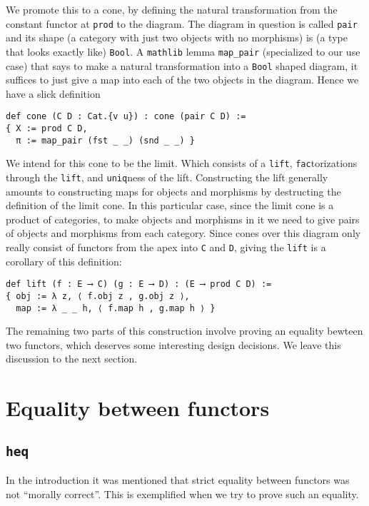 \documentclass{article}
\newcommand{\<}{\langle}
\renewcommand{\>}{\rangle}
\theoremstyle{definitionstyle}
\theoremstyle{exercisestyle}
\theoremstyle{remarkstyle}
\begin{document}
We promote this to a cone, by defining the natural transformation from
the constant functor at \texttt{prod} to the diagram.
The diagram in question is called \texttt{pair} and its shape
(a category with just two objects with no morphisms) is (a type that looks exactly like) \texttt{Bool}.
A \texttt{mathlib} lemma \texttt{map\_pair} (specialized to our use case) that says to make a
natural transformation into a \texttt{Bool} shaped diagram,
it suffices to just give a map into each of the two objects in the diagram.
Hence we have a slick definition

\begin{lstlisting}
def cone (C D : Cat.{v u}) : cone (pair C D) :=
{ X := prod C D,
  π := map_pair (fst _ _) (snd _ _) } \end{lstlisting}

We intend for this cone to be the limit.
Which consists of a \texttt{lift}, \texttt{fac}torizations through the \texttt{lift},
and \texttt{uniq}ness of the lift.
Constructing the lift generally amounts to constructing maps for objects and morphisms
by destructing the definition of the limit cone.
In this particular case, since the limit cone is a product of categories,
to make objects and morphisms in it we need to give pairs of objects
and morphisms from each category.
Since cones over this diagram only really consist of functors from the apex
into \texttt{C} and \texttt{D}, giving the \texttt{lift} is a corollary of this definition:

\begin{lstlisting}
def lift (f : E ⟶ C) (g : E ⟶ D) : (E ⟶ prod C D) :=
{ obj := λ z, ⟨ f.obj z , g.obj z ⟩,
  map := λ _ _ h, ⟨ f.map h , g.map h ⟩ }\end{lstlisting}

The remaining two parts of this construction involve proving an equality bewteen two functors,
which deserves some interesting design decisions.
We leave this discussion to the next section.

\section{Equality between functors}

\subsection{\texttt{heq}}

In the introduction it was mentioned that strict equality between
functors was not ``morally correct''.
This is exemplified when we try to prove such an equality.
\end{document}
